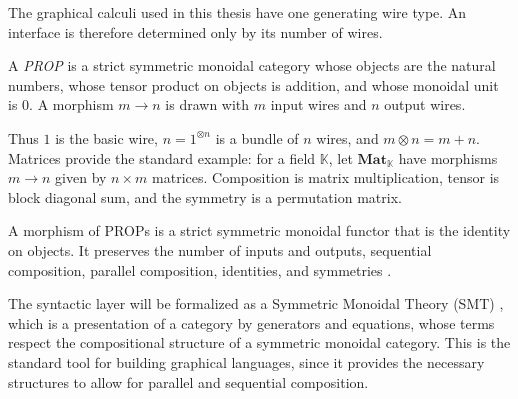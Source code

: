 The graphical calculi used in this thesis have one generating wire type.  An
interface is therefore determined only by its number of wires.

\begin{definition}[PROP]\label{def:main-prop}
A \emph{PROP} is a strict symmetric monoidal category whose objects are the
natural numbers, whose tensor product on objects is addition, and whose
monoidal unit is $0$.  A morphism $m\to n$ is drawn with $m$ input wires and
$n$ output wires.
\end{definition}

Thus $1$ is the basic wire, $n=1^{\otimes n}$ is a bundle of $n$ wires, and
$m\otimes n=m+n$.  Matrices provide the standard example: for a field
$\mathbb K$, let $\mathbf{Mat}_{\mathbb K}$ have morphisms $m\to n$ given by
$n\times m$ matrices.  Composition is matrix multiplication, tensor is block
diagonal sum, and the symmetry is a permutation matrix.

A morphism of PROPs is a strict symmetric monoidal functor that is the
identity on objects. It preserves the number of inputs and outputs, sequential
composition, parallel composition, identities, and symmetries
\cite[Section~2.1]{bonchi2017interacting}.

The syntactic layer will be formalized as a Symmetric Monoidal Theory (SMT)
\cite{bonchi2017interacting}, which is a presentation of a category by generators
and equations, whose terms respect the compositional structure of a symmetric monoidal
category. This is the standard tool for building graphical languages, since it provides
the necessary structures to allow for parallel and sequential composition.

